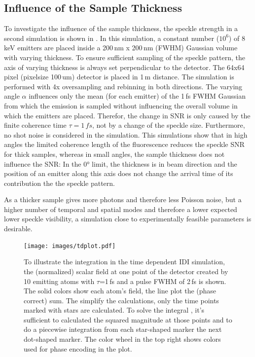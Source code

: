 \subsection{Influence of the Sample Thickness}
To investigate the influence of the sample thickness, the speckle strength in a second simulation is shown in . In this simulation, a constant number ($10^6$) of 8\,keV emitters are placed inside a 200\,nm x 200\,nm (FWHM) Gaussian volume with varying thickness. To ensure sufficient sampling of the speckle pattern, the axis of varying thickness is always set perpendicular to the detector. The 64x64 pixel (pixelsize 100\,um) detector is placed in 1\,m distance. The simulation is performed with 4x oversampling and rebinning in both directions. The varying angle $\alpha$ influences only the mean (for each emitter) of the 1\,fs FWHM Gaussian from which the emission is sampled without influencing the overall volume in which the emitters are placed. Therefor, the change in SNR is only caused by the finite coherence time $\tau=1\,fs$, not by a change of the speckle size. Furthermore, no shot noise is considered in the simulation.
This simulations show that in high angles the limited coherence length of the fluorescence reduces the speckle SNR for thick samples, whereas in small angles, the sample thickness does not influence the SNR: In the 0° limit, the thickness is in beam direction and the position of an emitter along this axis does not change the arrival time of its contribution the the speckle pattern.




 As a thicker sample gives more photons and therefore less Poisson noise, but a higher number of temporal and spatial modes and therefore a lower expected lower speckle visibility, a simulation close to experimentally feasible parameters is desirable.



\begin{figure}
	   \centering
		\texttt{[image: images/tdplot.pdf]}
	\caption[Integration in Time Dependent IDI Simulation]{To illustrate the integration in the time dependent IDI simulation, the (normalized) scalar field at one point of the detector created by 10 emitting atoms with $\tau$=1\,fs and a pulse FWHM of 2\,fs is shown. The solid colors show each atom's field, the line plot the (phase correct) sum. The simplify the calculations, only the time points marked with stars are calculated. To solve the integral , it's sufficient to calculated the squared magnitude at those points and to do a piecewise integration from each star-shaped marker the next dot-shaped marker. The color wheel in the top right shows colors used for phase encoding in the plot.}
	\label{fig:tdplot}
\end{figure}


